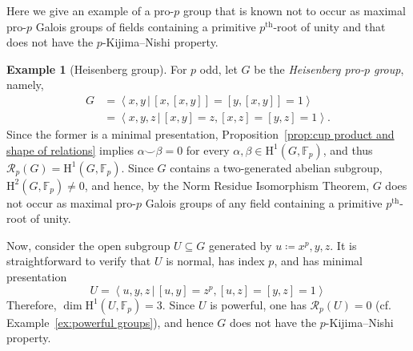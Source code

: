 \documentclass{amsart}
\theoremstyle{definition}
\newtheorem{ex}[thm]{Example}
\theoremstyle{remark}
\newcommand{\FF}{\mathbb{F}}
\newcommand{\calR}{\mathcal{R}}
\newcommand{\rmH}{\mathrm H}%
\newcommand{\pres}[2]{\left\langle{#1}\, \big\vert\, {#2}\right\rangle}
\begin{document}
Here we give an example of a pro-$p$ group that is known not to occur as maximal pro-$p$ Galois groups of fields containing a primitive $p^{\mathrm{th}}$-root of unity and that does not have the $p$-Kijima--Nishi property.
\begin{ex}[Heisenberg group]
\label{ex:Heisenberg}
For $p$ odd, let $G$ be the \emph{Heisenberg pro-$p$ group}, namely, 
    \[\begin{split}
        G&=\pres{x,y}{[x,[x,y]]=[y,[x,y]]=1}\\
        &=\pres{x,y,z}{[x,y]=z,[x,z]=[y,z]=1}.
    \end{split}\]
Since the former is a minimal presentation, Proposition~\ref{prop:cup product and shape of relations} implies $\alpha\smallsmile\beta=0$ for every $\alpha,\beta\in\rmH^1(G,\FF_p)$, and thus $\calR_p(G)=\rmH^1(G,\FF_p)$. Since $G$ contains a two-generated abelian subgroup, $\rmH^2(G,\FF_p)\neq 0$, and hence, by the Norm Residue Isomorphism Theorem, $G$ does not occur as maximal pro-$p$ Galois groups of any field containing a primitive $p^{\mathrm{th}}$-root of unity.

\noindent
Now, consider the open subgroup $U\subseteq G$ generated by $u\coloneq x^p,y,z$. {It is straightforward to verify that $U$ is normal, has index $p$, and has minimal presentation} 
\[U=\pres{u,y,z}{[u,y]=z^p, [u,z]=[y,z]=1}\]
Therefore, $\dim \rmH^1(U,\FF_p)=3$. Since $U$ is powerful, one has $\calR_p(U)=0$ (cf. Example~\ref{ex:powerful groups}), and hence $G$ does not have the $p$-Kijima--Nishi property.
\end{ex}


\end{document}
